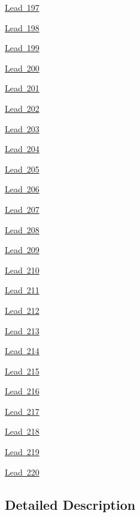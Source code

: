 \begin{DoxyCompactItemize}
\item 
\mbox{\hyperlink{group___isotope_const-_lead-_pb197}{Lead 197}}
\item 
\mbox{\hyperlink{group___isotope_const-_lead-_pb198}{Lead 198}}
\item 
\mbox{\hyperlink{group___isotope_const-_lead-_pb199}{Lead 199}}
\item 
\mbox{\hyperlink{group___isotope_const-_lead-_pb200}{Lead 200}}
\item 
\mbox{\hyperlink{group___isotope_const-_lead-_pb201}{Lead 201}}
\item 
\mbox{\hyperlink{group___isotope_const-_lead-_pb202}{Lead 202}}
\item 
\mbox{\hyperlink{group___isotope_const-_lead-_pb203}{Lead 203}}
\item 
\mbox{\hyperlink{group___isotope_const-_lead-_pb204}{Lead 204}}
\item 
\mbox{\hyperlink{group___isotope_const-_lead-_pb205}{Lead 205}}
\item 
\mbox{\hyperlink{group___isotope_const-_lead-_pb206}{Lead 206}}
\item 
\mbox{\hyperlink{group___isotope_const-_lead-_pb207}{Lead 207}}
\item 
\mbox{\hyperlink{group___isotope_const-_lead-_pb208}{Lead 208}}
\item 
\mbox{\hyperlink{group___isotope_const-_lead-_pb209}{Lead 209}}
\item 
\mbox{\hyperlink{group___isotope_const-_lead-_pb210}{Lead 210}}
\item 
\mbox{\hyperlink{group___isotope_const-_lead-_pb211}{Lead 211}}
\item 
\mbox{\hyperlink{group___isotope_const-_lead-_pb212}{Lead 212}}
\item 
\mbox{\hyperlink{group___isotope_const-_lead-_pb213}{Lead 213}}
\item 
\mbox{\hyperlink{group___isotope_const-_lead-_pb214}{Lead 214}}
\item 
\mbox{\hyperlink{group___isotope_const-_lead-_pb215}{Lead 215}}
\item 
\mbox{\hyperlink{group___isotope_const-_lead-_pb216}{Lead 216}}
\item 
\mbox{\hyperlink{group___isotope_const-_lead-_pb217}{Lead 217}}
\item 
\mbox{\hyperlink{group___isotope_const-_lead-_pb218}{Lead 218}}
\item 
\mbox{\hyperlink{group___isotope_const-_lead-_pb219}{Lead 219}}
\item 
\mbox{\hyperlink{group___isotope_const-_lead-_pb220}{Lead 220}}
\end{DoxyCompactItemize}


\subsection{Detailed Description}
